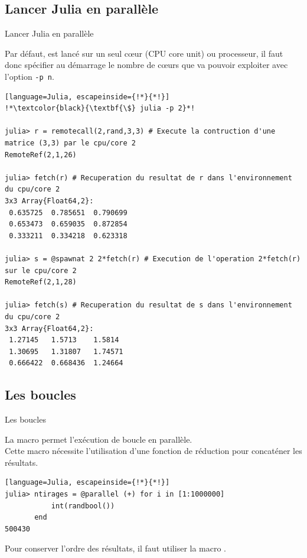 \subsection{Lancer Julia en parallèle}
\begin{frame}[containsverbatim]{Lancer Julia en parallèle}
\par{Par défaut, {\Julia} est lancé sur un seul c\oe{}ur (CPU core unit) ou processeur, il faut donc spécifier au démarrage le nombre de c\oe{}urs que {\Julia} va pouvoir exploiter avec l'option \texttt{-p n}.}
\begin{lstlisting}[language=Julia, escapeinside={!*}{*!}]
!*\textcolor{black}{\textbf{\$} julia -p 2}*!

julia> r = remotecall(2,rand,3,3) # Execute la contruction d'une matrice (3,3) par le cpu/core 2
RemoteRef(2,1,26)

julia> fetch(r) # Recuperation du resultat de r dans l'environnement du cpu/core 2
3x3 Array{Float64,2}:
 0.635725  0.785651  0.790699
 0.653473  0.659035  0.872854
 0.333211  0.334218  0.623318

julia> s = @spawnat 2 2*fetch(r) # Execution de l'operation 2*fetch(r) sur le cpu/core 2
RemoteRef(2,1,28)

julia> fetch(s) # Recuperation du resultat de s dans l'environnement du cpu/core 2
3x3 Array{Float64,2}:
 1.27145   1.5713    1.5814
 1.30695   1.31807   1.74571
 0.666422  0.668436  1.24664
\end{lstlisting}
\end{frame}


\subsection{Les boucles}
\begin{frame}[containsverbatim]{Les boucles}
\par{La macro  permet l'exécution de boucle en parallèle.
\\\vspace{2ex}Cette macro nécessite l'utilisation d'une fonction de réduction pour concaténer les résultats.}
\begin{lstlisting}[language=Julia, escapeinside={!*}{*!}]
julia> ntirages = @parallel (+) for i in [1:1000000]
           int(randbool())
       end
500430
\end{lstlisting}
\par{Pour conserver l'ordre des résultats, il faut utiliser la macro .}
\end{frame}

